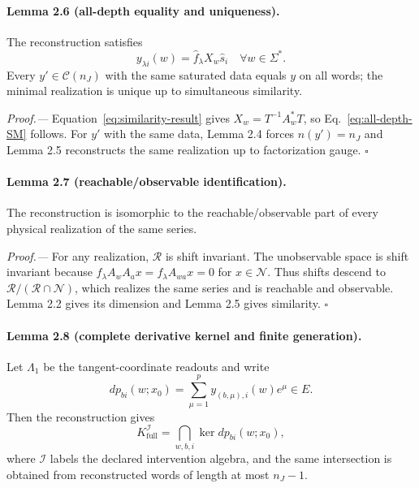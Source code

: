\documentclass[aps,prl,reprint,superscriptaddress,nofootinbib]{revtex4-2}
\newcommand{\full}{\mathrm{full}}
\newcommand{\cN}{\mathcal N}
\newcommand{\cR}{\mathcal R}
\newcommand{\cC}{\mathcal C}
\begin{document}
\paragraph{Lemma 2.6 (all-depth equality and uniqueness).}
The reconstruction satisfies
\begin{equation}
 y_{\lambda i}(w)=\widehat f_\lambda X_w\widehat s_i
 \quad\forall w\in\Sigma^*.
 \label{eq:all-depth-SM}
\end{equation}
Every $y'\in\cC(n_J)$ with the same saturated data equals $y$ on all words; the minimal realization is unique up to simultaneous similarity.

\emph{Proof.---}
Equation~\eqref{eq:similarity-result} gives $X_w=T^{-1}A_w^*T$, so Eq.~\eqref{eq:all-depth-SM} follows.  For $y'$ with the same data, Lemma 2.4 forces $n(y')=n_J$ and Lemma 2.5 reconstructs the same realization up to factorization gauge. \hfill$\square$

\paragraph{Lemma 2.7 (reachable/observable identification).}
The reconstruction is isomorphic to the reachable/observable part of every physical realization of the same series.

\emph{Proof.---}
For any realization, $\cR$ is shift invariant.  The unobservable space is shift invariant because $f_\lambda A_wA_ax=f_\lambda A_{wa}x=0$ for $x\in\cN$.  Thus shifts descend to $\cR/(\cR\cap\cN)$, which realizes the same series and is reachable and observable.  Lemma 2.2 gives its dimension and Lemma 2.5 gives similarity. \hfill$\square$

\paragraph{Lemma 2.8 (complete derivative kernel and finite generation).}
Let $\Lambda_1$ be the tangent-coordinate readouts and write
\begin{equation}
 dp_{bi}(w;x_0)=\sum_{\mu=1}^p y_{(b,\mu),i}(w)e^\mu\in E.
 \label{eq:derivative-covector}
\end{equation}
Then the reconstruction gives
\begin{equation}
 K_{\full}^{\mathcal I}=\bigcap_{w,b,i}\ker dp_{bi}(w;x_0),
 \label{eq:full-kernel-SM}
\end{equation}
where $\mathcal I$ labels the declared intervention algebra, and the same intersection is obtained from reconstructed words of length at most $n_J-1$.
\end{document}
